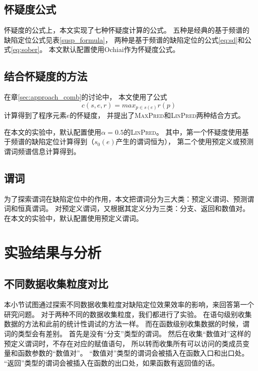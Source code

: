 \subsection{怀疑度公式}
\label{sec:exp_all_formula}

怀疑度的公式上，本文实现了七种怀疑度计算的公式。
五种是经典的基于频谱的缺陷定位公式见表\ref{susp_formula}，
两种是基于频谱的缺陷定位的公式\ref{eq:sd}和公式\ref{eq:sober}。
本文默认配置使用Ochiai作为怀疑度公式。

\subsection{结合怀疑度的方法}

在章\ref{sec:approach_comb}的讨论中，
本文使用了公式
$$
c(s,e,r) = max_{p \in s(e)}r(p)
$$
计算得到了程序元素$e$的怀疑度，
并提出了\textsc{MaxPred}和\textsc{LinPred}两种结合方式。

在本文的实验中，默认配置使用$\alpha = 0.5$的\textsc{LinPred}。
其中，第一个怀疑度使用基于频谱的缺陷定位计算得到（$s_0(e)$产生的谓词恒为），
第二个使用预定义或预测谓词频谱信息计算得到。

\subsection{谓词}

为了探索谓词在缺陷定位中的作用，本文把谓词分为三大类：预定义谓词、预测谓词和恒真谓词。
对预定义谓词，又根据其定义分为三类：分支、返回和数值对。
在本文的实验中，默认配置使用预定义谓词。

\section{实验结果与分析}

\subsection{不同数据收集粒度对比}

本小节试图通过探索不同数据收集粒度对缺陷定位效果效率的影响，来回答第一个研究问题。
对于两种不同的数据收集粒度，我们都进行了实验。
在语句级别收集数据的方法和此前的统计性调试的方法一样。
而在函数级别收集数据的时候，谓词的类型会有差别。
首先是没有“分支”类型的谓词。
然后在收集“数值对”这样的预定义谓词时，不存在对应的赋值语句，
所以转而收集所有可以访问的类成员变量和函数参数的“数值对”。
“数值对”类型的谓词会被插入在函数入口和出口处。
“返回”类型的谓词会被插入在函数的出口处，如果函数有返回值的话。

